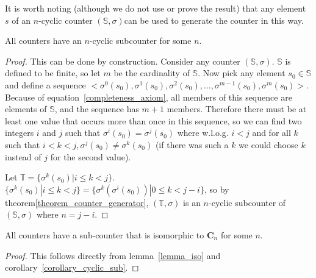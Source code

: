\documentclass[5p, twocolumn]{elsarticle}
\begin{document}
\begin{remark}
It is worth noting (although we do not use or prove the result) that any element $s$ of an $n$-cyclic counter $(\mathbb{S},\sigma)$can be used to generate the counter in this way.
\end{remark}

\begin{corollary}
All counters have an $n$-cyclic subcounter for some $n$.
\label{corollary_cyclic_sub}
\end{corollary}

\begin{proof}
This can be done by construction. Consider any counter $(\mathbb{S},\sigma)$. $\mathbb{S}$ is defined to be finite, so let $m$ be the cardinality of $\mathbb{S}$. Now pick any element $s_0\in\mathbb{S}$ and define a sequence $<\sigma^0(s_0),\sigma^1(s_0),\sigma^2(s_0), \ldots ,\sigma^{m-1}(s_0),\sigma^m(s_0)>$. Because of equation~\ref{completeness_axiom}, all members of this sequence are elements of $\mathbb{S}$, and the sequence has $m+1$ members. Therefore there must be at least one value that occurs more than once in this sequence, so we can find two integers $i$ and $j$ such that $\sigma^i(s_0)=\sigma^j(s_0)$ where w.l.o.g. $i<j$ and for all $k$ such that $i<k<j, \sigma^j(s_0)\neq\sigma^k(s_0)$ (if there was such a $k$ we could choose $k$ instead of $j$ for the second value).

Let $\mathbb{T}=\{\sigma^k(s_0)|i\leq k<j\}$. $\{\sigma^k(s_0)|i\leq k<j\}=\{\sigma^k(\sigma^i(s_0))|0\leq k<j-i\}$, so by theorem\ref{theorem_counter_generator}, $(\mathbb{T},\sigma)$ is an $n$-cyclic subcounter of $(\mathbb{S},\sigma)$ where $n=j-i$.
\end{proof}

\begin{theorem}
All counters have a sub-counter that is isomorphic to $\mathbf{C}_n$ for some $n$.
\label{counter_central_theorem}
\end{theorem}

\begin{proof}
This follows directly from lemma~\ref{lemma_iso} and corollary~\ref{corollary_cyclic_sub}.
\end{proof}

% 
\end{document}
